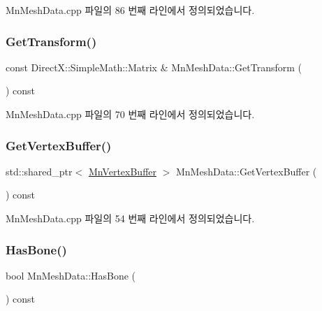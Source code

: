 Mn\+Mesh\+Data.\+cpp 파일의 86 번째 라인에서 정의되었습니다.

\mbox{\label{class_m_n_l_1_1_mn_mesh_data_a14d9a6fd189c2c9b0f5c34b3a1aa7ec9}} 
\subsubsection{\texorpdfstring{Get\+Transform()}{GetTransform()}}
{\footnotesize\ttfamily const Direct\+X\+::\+Simple\+Math\+::\+Matrix \& Mn\+Mesh\+Data\+::\+Get\+Transform (\begin{DoxyParamCaption}{ }\end{DoxyParamCaption}) const}



Mn\+Mesh\+Data.\+cpp 파일의 70 번째 라인에서 정의되었습니다.

\mbox{\label{class_m_n_l_1_1_mn_mesh_data_a63f8b56714a35f4c1dc1a09dc8f936a1}} 
\subsubsection{\texorpdfstring{Get\+Vertex\+Buffer()}{GetVertexBuffer()}}
{\footnotesize\ttfamily std\+::shared\+\_\+ptr$<$ \hyperlink{class_m_n_l_1_1_mn_vertex_buffer}{Mn\+Vertex\+Buffer} $>$ Mn\+Mesh\+Data\+::\+Get\+Vertex\+Buffer (\begin{DoxyParamCaption}{ }\end{DoxyParamCaption}) const}



Mn\+Mesh\+Data.\+cpp 파일의 54 번째 라인에서 정의되었습니다.

\mbox{\label{class_m_n_l_1_1_mn_mesh_data_a506c6520b99a9e0eba9cf4b2156c275c}} 
\subsubsection{\texorpdfstring{Has\+Bone()}{HasBone()}}
{\footnotesize\ttfamily bool Mn\+Mesh\+Data\+::\+Has\+Bone (\begin{DoxyParamCaption}{ }\end{DoxyParamCaption}) const}



